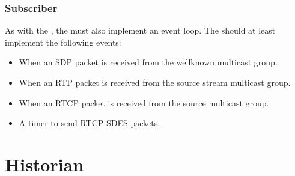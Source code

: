 \subsubsection{Subscriber}

As with the \pub{}, the \sub{} must also implement an event loop. The \sub{} should at least implement the following events:

\begin{itemize}
	\item When an SDP packet is received from the wellknown multicast group.
	\item When an RTP packet is received from the source stream multicast group.
	\item When an RTCP packet is received from the source multicast group.
	\item A timer to send RTCP SDES packets.
\end{itemize}



\section{Historian}